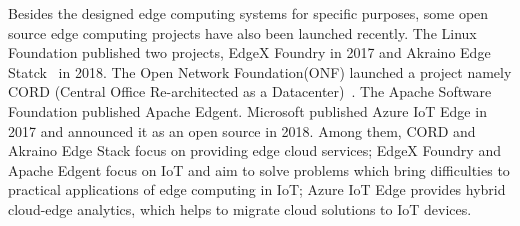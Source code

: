 \label{sec:open-source-projects}
Besides the designed edge computing systems for specific purposes, some open source edge computing projects have also been launched recently. The Linux Foundation published two projects, EdgeX Foundry in 2017 and Akraino Edge Statck~ in 2018. The Open Network Foundation(ONF) launched a project namely CORD (Central Office Re-architected as a Datacenter)~. The Apache Software Foundation published Apache Edgent. Microsoft published Azure IoT Edge in 2017 and announced it as an open source in 2018.
Among them, CORD and Akraino Edge Stack focus on providing edge cloud services; EdgeX Foundry and Apache Edgent focus on IoT and aim to solve problems which bring difficulties to practical applications of edge computing in IoT; Azure IoT Edge provides hybrid cloud-edge analytics, which helps to migrate cloud solutions to IoT devices.


